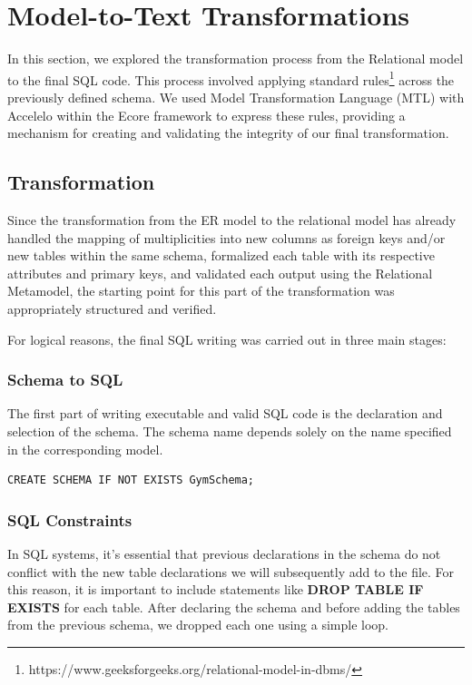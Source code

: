 \documentclass[10pt]{article}
\begin{document}
\section{Model-to-Text Transformations}

In this section, we explored the transformation process from the Relational model to the final SQL code. This process involved applying standard rules\footnote{https://www.geeksforgeeks.org/relational-model-in-dbms/} across the previously defined schema. We used Model Transformation Language (MTL) with Accelelo within the Ecore framework to express these rules, providing a mechanism for creating and validating the integrity of our final transformation.

\subsection{Transformation}

Since the transformation from the ER model to the relational model has already handled the mapping of multiplicities into new columns as foreign keys and/or new tables within the same schema, formalized each table with its respective attributes and primary keys, and validated each output using the Relational Metamodel, the starting point for this part of the transformation was appropriately structured and verified.

For logical reasons, the final SQL writing was carried out in three main stages:

\subsubsection{Schema to SQL}

The first part of writing executable and valid SQL code is the declaration and selection of the schema. The schema name depends solely on the name specified in the corresponding model.

\begin{lstlisting}
CREATE SCHEMA IF NOT EXISTS GymSchema;
\end{lstlisting}

\subsubsection{SQL Constraints}

In SQL systems, it's essential that previous declarations in the schema do not conflict with the new table declarations we will subsequently add to the file. For this reason, it is important to include statements like \textbf{DROP TABLE IF EXISTS} for each table. After declaring the schema and before adding the tables from the previous schema, we dropped each one using a simple loop.
\end{document}
